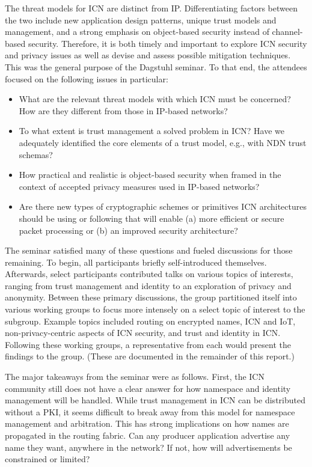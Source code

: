 \documentclass[a4paper,UKenglish]{dagrep}
\begin{document}
The threat models for ICN are distinct from IP. Differentiating factors between the two include new application design patterns, unique trust models and management, and a strong emphasis on object-based security instead of channel-based security. Therefore, it is both timely and important to explore ICN security and privacy issues as well as devise and assess possible mitigation techniques. This was the general purpose of the Dagstuhl seminar. To that end, the attendees focused on the following issues in particular:
%
\begin{itemize}
\item What are the relevant threat models with which ICN must be concerned? How are they different from those in IP-based networks?
\item To what extent is trust management a solved problem in ICN? Have we adequately identified the core elements of a trust model, e.g., with NDN trust schemas?
\item How practical and realistic is object-based security when framed in the context of accepted privacy measures used in IP-based networks?
\item Are there new types of cryptographic schemes or primitives ICN architectures should be using or following that will enable (a) more efficient or secure packet processing or (b) an improved security architecture?
\end{itemize}
%
The seminar satisfied many of these questions and fueled discussions for those remaining. To begin, all participants briefly self-introduced themselves. Afterwards, select participants contributed talks on various topics of interests, ranging from trust management and identity to an exploration of privacy and anonymity. Between these primary discussions, the group partitioned itself into various working groups to focus more intensely on a select topic of interest to the subgroup. Example topics included routing on encrypted names, ICN and IoT, non-privacy-centric aspects of ICN security, and trust and identity in ICN. Following these working groups, a representative from each would present the findings to the group. (These are documented in the remainder of this report.)

The major takeaways from the seminar were as follows. First, the ICN community still does not have a clear answer for how namespace and identity management will be handled. While trust management in ICN can be distributed without a PKI, it seems difficult to break away from this model for namespace management and arbitration. This has strong implications on how names are propagated in the routing fabric. Can any producer application advertise any name they want, anywhere in the network? If not, how will advertisements be constrained or limited?
\end{document}
